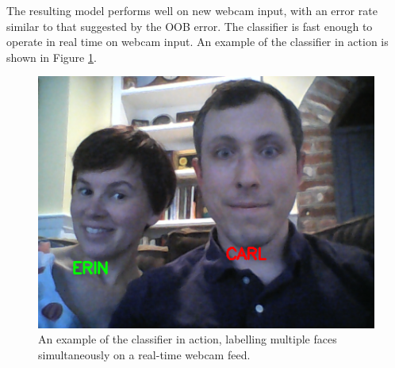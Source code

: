 \documentclass[10pt,a4paper]{article}
\begin{document}
The resulting model performs well on new webcam input, with an error rate similar to that suggested by the OOB error. The classifier is fast enough to operate in real time on webcam input. An example of the classifier in action is shown in Figure \ref{fig:faces}.
\begin{figure}
	\centering
	\includegraphics[width=0.8\linewidth]{00085}
	\caption{An example of the classifier in action, labelling multiple faces simultaneously on a real-time webcam feed.}
	\label{fig:faces}
\end{figure}
\end{document}
